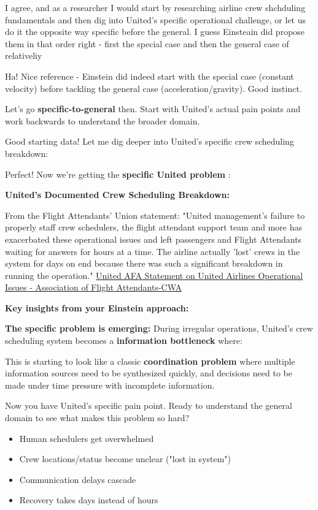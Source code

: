 \begin{userprompt}
I agree, and as a researcher I would start by researching airline crew shchduling fundamentals and then dig into United's specific operational challenge, or let us do it the opposite way specific before the general. I guess Einsteain did propose them in that order right - first the special case and then the general case of relativeliy
\end{userprompt}

\begin{botresponse}
Ha! Nice reference - Einstein did indeed start with the special case (constant velocity) before tackling the general case (acceleration/gravity). Good instinct.

Let's go \textbf{specific-to-general} then. Start with United's actual pain points and work backwards to understand the broader domain.

Good starting data! Let me dig deeper into United's specific crew scheduling breakdown:

Perfect! Now we're getting the \textbf{specific United problem} :

\textbf{United's Documented Crew Scheduling Breakdown:}

From the Flight Attendants' Union statement: "United management's failure to properly staff crew schedulers, the flight attendant support team and more has exacerbated these operational issues and left passengers and Flight Attendants waiting for answers for hours at a time. The airline actually 'lost' crews in the system for days on end because there was such a significant breakdown in running the operation." \href{https://www.afacwa.org/statement_united_operational_issues}{United AFA Statement on United Airlines Operational Issues - Association of Flight Attendants-CWA}

\textbf{Key insights from your Einstein approach:}

\textbf{The specific problem is emerging:} During irregular operations, United's crew scheduling system becomes a \textbf{information bottleneck} where:

This is starting to look like a classic \textbf{coordination problem} where multiple information sources need to be synthesized quickly, and decisions need to be made under time pressure with incomplete information.

Now you have United's specific pain point. Ready to understand the general domain to see what makes this problem so hard?

\begin{itemize}
\item Human schedulers get overwhelmed
\item Crew locations/status become unclear ("lost in system")
\item Communication delays cascade
\item Recovery takes days instead of hours
\end{itemize}


\end{botresponse}
